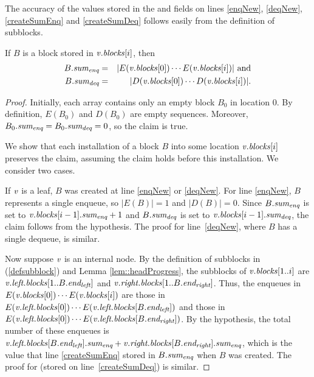 The accuracy of the values stored in the  and  fields
on lines \ref{enqNew}, \ref{deqNew}, \ref{createSumEnq} and \ref{createSumDeq} follows easily
from the definition of subblocks.

\begin{invariant}
\label{inv::sum}
If $B$ is a block stored in $\mbox{\textnormal{\textit{v}}}.\mbox{\textit{blocks}}[i]$, then
\begin{eqnarray*}
B.\mbox{\textit{sum\textsubscript{enq}}} &=& | E(\mbox{\textnormal{\textit{v}}}.\mbox{\textit{blocks}}[0])\cdots E(\mbox{\textnormal{\textit{v}}}.\mbox{\textit{blocks}}[i]) | \mbox{ and}\\
B.\mbox{\textit{sum\textsubscript{deq}}} &=& | D(\mbox{\textnormal{\textit{v}}}.\mbox{\textit{blocks}}[0])\cdots D(\mbox{\textnormal{\textit{v}}}.\mbox{\textit{blocks}}[i]) |.
\end{eqnarray*}
\end{invariant}

\begin{proof}
Initially, each  array  contains only an empty block $B_0$ in location 0.
By definition, $E(B_0)$ and $D(B_0)$ are empty sequences.
Moreover, $B_0.\mbox{\textit{sum\textsubscript{enq}}} = B_0.\mbox{\textit{sum\textsubscript{deq}}} = 0$, so the claim is true.

We show that each installation of a block $B$ into some location $\mbox{\textnormal{\textit{v}}}.\mbox{\textit{blocks}}[i]$ preserves the claim,
assuming the claim holds before this installation.  We consider two cases.

If $\mbox{\textnormal{\textit{v}}}$ is a leaf, $B$ was created at line \ref{enqNew} or \ref{deqNew}.
For line \ref{enqNew}, $B$ represents a single enqueue, so $|E(B)|=1$ and $|D(B)|=0$.
Since $B.\mbox{\textit{sum\textsubscript{enq}}}$ is set to $\mbox{\textnormal{\textit{v}}}.\mbox{\textit{blocks}}[i-1].\mbox{\textit{sum\textsubscript{enq}}}+1$ and
$B.\mbox{\textit{sum\textsubscript{deq}}}$ is set to $\mbox{\textnormal{\textit{v}}}.\mbox{\textit{blocks}}[i-1].\mbox{\textit{sum\textsubscript{deq}}}$, the claim follows from the hypothesis.
The proof for line~\ref{deqNew}, where $B$ has a single dequeue, is similar.

Now suppose $\mbox{\textnormal{\textit{v}}}$ is an internal node. By the definition of subblocks in (\ref{defsubblock}) and Lemma \ref{lem::headProgress}, the
subblocks of $\mbox{\textnormal{\textit{v}}}.\mbox{\textit{blocks}}[1..i]$ are $\mbox{\textnormal{\textit{v}}}.\mbox{\textit{left.blocks}}[1..B.\mbox{\textit{end\textsubscript{left}}}]$ 
and $\mbox{\textnormal{\textit{v}}}.\mbox{\textit{right.blocks}}[1..B.\mbox{\textit{end\textsubscript{right}}}]$.
Thus, the enqueues in $E(\mbox{\textnormal{\textit{v}}}.\mbox{\textit{blocks}}[0])\cdots E(\mbox{\textnormal{\textit{v}}}.\mbox{\textit{blocks}}[i])$ are those in
$E(\mbox{\textnormal{\textit{v}}}.\mbox{\textit{left.blocks}}[0]) \cdots E(\mbox{\textnormal{\textit{v}}}.\mbox{\textit{left.blocks}}[B.\mbox{\textit{end\textsubscript{left}}}])$ and those in 
$E(\mbox{\textnormal{\textit{v}}}.\mbox{\textit{left.blocks}}[0]) \cdots E(\mbox{\textnormal{\textit{v}}}.\mbox{\textit{left.blocks}}[B.\mbox{\textit{end\textsubscript{right}}}])$.
By the hypothesis, the total number of these enqueues is 
$\mbox{\textnormal{\textit{v}}}.\mbox{\textit{left.blocks}}[B.\mbox{\textit{end\textsubscript{left}}}].\mbox{\textit{sum\textsubscript{enq}}} + \mbox{\textnormal{\textit{v}}}.\mbox{\textit{right.blocks}}[B.\mbox{\textit{end\textsubscript{right}}}].\mbox{\textit{sum\textsubscript{enq}}}$, 
which is the value that line \ref{createSumEnq} stored in $B.\mbox{\textit{sum\textsubscript{enq}}}$ when $B$ was created.
The proof for  (stored on line~\ref{createSumDeq}) is similar.
\end{proof}

